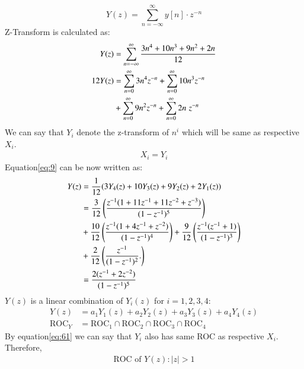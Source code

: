 \documentclass[journal,12pt,twocolumn]{IEEEtran}
\theoremstyle{remark}
\begin{document}
\begin{enumerate}[label=\alph*)]
\begin{equation}
    Y(z) = \sum_{n=-\infty}^\infty y[n]\cdot z^{-n}
\end{equation}
Z-Transform is calculated as:
\begin{align}\label{eq:9}
    Y(z) &= \sum_{n=-\infty}^\infty\frac{3n^4 + 10n^3 + 9n^2 + 2n}{12}\\
    12Y(z) &= \sum_{n=0}^\infty 3n^4z^{-n} +  \sum_{n=0}^\infty 10n^3z^{-n}\\ &+  \sum_{n=0}^\infty 9n^2 z^{-n} +\sum_{n=0}^\infty 2n\hspace{3pt}z^{-n}\notag
\end{align}
We can say that $Y_i$ denote the z-transform of $n^{i}$ which will be same as respective $X_i$.
\begin{align}\label{eq:61}
    X_i=Y_i
\end{align}
Equation\eqref{eq:9} can be now written as:
\begin{align}
    Y(z) &=\frac{1}{12}(3Y_4(z) + 10Y_3(z) + 9Y_2(z) + 2Y_1(z)) \\
         &= \frac{3}{12}\left(\frac{z^{-1}(1+11z^{-1}+11z^{-2}+z^{-3})}{(1-z^{-1})^5}\right)\\ &+ \frac{10}{12}\left(\frac{z^{-1}(1+4z^{-1}+z^{-2})}{(1-z^{-1})^4}\right) 
         + \frac{9}{12}\left(\frac{z^{-1}(z^{-1}+1)}{(1-z^{-1})^3}\right)\notag \\ &+ \frac{2}{12}\left(\frac{z^{-1}}{(1-z^{-1})^2}.\right)\notag \\
         &= \frac{2(z^{-1}+2z^{-2})}{(1-z^{-1})^5}
\end{align}
\(Y(z)\) is a linear combination of \(Y_i(z)\) for \(i=1,2,3,4\):
\begin{align}
    Y(z) &= a_1 Y_1(z) + a_2 Y_2(z) + a_3 Y_3(z) + a_4 Y_4(z) \label{eq:linear_combination_Y} \\
    \text{ROC}_{Y} &= \text{ROC}_{1} \cap \text{ROC}_{2} \cap \text{ROC}_{3} \cap \text{ROC}_{4} \label{eq:roc_Y}
\end{align}
By equation\eqref{eq:61} we can say that $Y_i$ also has same ROC as respective $X_i$. Therefore,\\
\begin{align}
    \text{ROC of $Y(z)$} : |z|>1
\end{align}
\end{enumerate}
\end{document}
